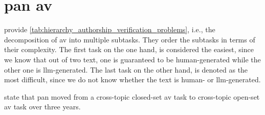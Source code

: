 \section{\acs{pan} \ac{av}}
\label{sec:pan_authorship_verification}

\citet{ayele_overview_2024} provide \autoref{tab:hierarchy_authorship_verification_problems}, i.e., 
the decomposition of \ac{av} into multiple subtasks. 
They order the subtasks in terms of their complexity.
The first task on the one hand, is considered the easiest, since we know that out of two text, one is guaranteed to be human-generated while the other one is \ac{llm}-generated.
The last task on the other hand, is denoted as the most difficult, since we do not know whether the text is human- or \ac{llm}-generated.


\begin{table}[tbp]
    \centering
    \caption{Hierarchy of \ac{av} problems \citep{ayele_overview_2024,bevendorff_overview_2024} from easiest (1) to most difficult (7), 
    where A, B corresponds to human-authored text and M denotes \ac{llm}-generated text.}
    \label{tab:hierarchy_authorship_verification_problems}
\end{table}

\citet{boenninghoff_o2d2_2021} state that \ac{pan} moved from a cross-topic closed-set \ac{av} task 
to cross-topic open-set \ac{av} task over three years.

